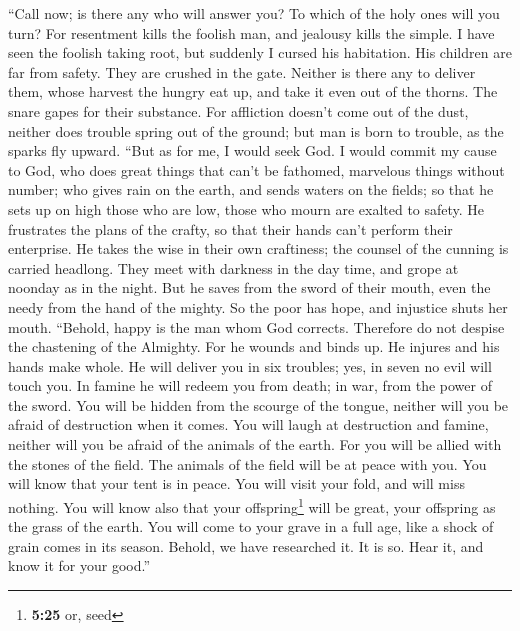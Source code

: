  ``Call now; is there any who will answer you? To which of
the holy ones will you turn?  For resentment kills the
foolish man, and jealousy kills the simple.  I have seen
the foolish taking root, but suddenly I cursed his habitation.
 His children are far from safety. They are crushed in the
gate. Neither is there any to deliver them,  whose harvest
the hungry eat up, and take it even out of the thorns. The snare gapes
for their substance.  For affliction doesn't come out of
the dust, neither does trouble spring out of the ground; 
but man is born to trouble, as the sparks fly upward. 
``But as for me, I would seek God. I would commit my cause to God,
 who does great things that can't be fathomed, marvelous
things without number;  who gives rain on the earth, and
sends waters on the fields;  so that he sets up on high
those who are low, those who mourn are exalted to safety.
 He frustrates the plans of the crafty, so that their
hands can't perform their enterprise.  He takes the wise
in their own craftiness; the counsel of the cunning is carried headlong.
 They meet with darkness in the day time, and grope at
noonday as in the night.  But he saves from the sword of
their mouth, even the needy from the hand of the mighty. 
So the poor has hope, and injustice shuts her mouth. 
``Behold, happy is the man whom God corrects. Therefore do not despise
the chastening of the Almighty.  For he wounds and binds
up. He injures and his hands make whole.  He will deliver
you in six troubles; yes, in seven no evil will touch you.
 In famine he will redeem you from death; in war, from
the power of the sword.  You will be hidden from the
scourge of the tongue, neither will you be afraid of destruction when it
comes.  You will laugh at destruction and famine, neither
will you be afraid of the animals of the earth.  For you
will be allied with the stones of the field. The animals of the field
will be at peace with you.  You will know that your tent
is in peace. You will visit your fold, and will miss nothing.
 You will know also that your offspring\footnote{\textbf{5:25}
  or, seed} will be great, your offspring as the grass of the earth.
 You will come to your grave in a full age, like a shock
of grain comes in its season.  Behold, we have researched
it. It is so. Hear it, and know it for your good.''

